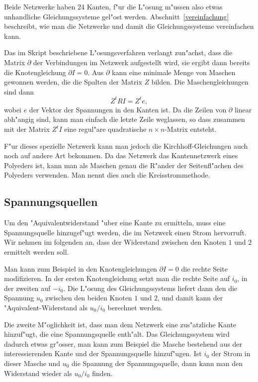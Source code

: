 \documentclass[a4paper,12pt]{article}
\begin{document}
Beide Netzwerke haben 24 Kanten, f"ur die L"osung m"ussen also etwas
unhandliche Gleichungssysteme gel"ost werden.
Abschnitt~\ref{vereinfachung} beschreibt, wie man die Netzwerke und
damit die Gleichungssysteme vereinfachen kann.

Das im Skript beschriebene L"osungsverfahren verlangt zun"achst,
dass die Matrix $\partial$ der Verbindungen im Netzwerk aufgestellt
wird, sie ergibt dann bereits die Knotengleichung $\partial I=0$.
Aus $\partial$ kann eine minimale Menge von Maschen gewonnen werden,
die die Spalten der Matrix $Z$ bilden.
Die Maschengleichungen sind dann
\[
Z^tRI=Z^te,
\]
wobei $e$ der Vektor der Spannungen in den Kanten ist.
Da die Zeilen von $\partial$ linear abh"angig sind, kann man
einfach die letzte Zeile weglassen, so dass zusammen mit der Matrix $Z^tI$
eine regul"are quadratische $n\times n$-Matrix entsteht.

F"ur dieses spezielle Netzwerk kann man jedoch die Kirchhoff-Gleichungen
auch noch auf andere Art bekommen.
Da das Netzwerk das Kantennetzwerk eines Polyeders ist, kann man als
Maschen genau die R"ander der Seitenfl"achen des Polyeders verwenden.
Man nennt dies auch die Kreisstrommethode.

\subsection{Spannungsquellen\label{quelle}}
Um den "Aquivalentwiderstand "uber eine Kante zu ermitteln, muss
eine Spannungsquelle hinzugef"ugt werden, die im Netzwerk einen
Strom hervorruft.
Wir nehmen im folgenden an, dass der Widerstand zwischen den Knoten
$1$ und $2$ ermittelt werden soll.

Man kann zum Beispiel in den Knotengleichungen $\partial I=0$
die rechte Seite modifizieren.
In der ersten Knotengleichung setzt man die rechte Seite auf $i_0$,
in der zweiten auf $-i_0$.
Die L"osung des Gleichungssystems liefert dann den die Spannung $u_0$ zwischen
den beiden Knoten $1$ und $2$, und damit kann der "Aquivalent-Widerstand
als $u_0/i_0$ berechnet werden.

Die zweite M"oglichkeit ist, dass man dem Netzwerk eine zus"atzliche
Kante hinzuf"ugt, die eine Spannungsquelle enth"alt. 
Das Gleichungssystem wird dadurch etwas gr"osser, man kann zum
Beispiel die Masche bestehend aus der interessierenden Kante und
der Spannungsquelle hinzuf"ugen.
Ist $i_0$ der Strom in dieser Masche und $u_0$ die Spannung der
Spannungsquelle, dann kann man den Widerstand wieder als $u_0/i_0$
finden.
\end{document}
